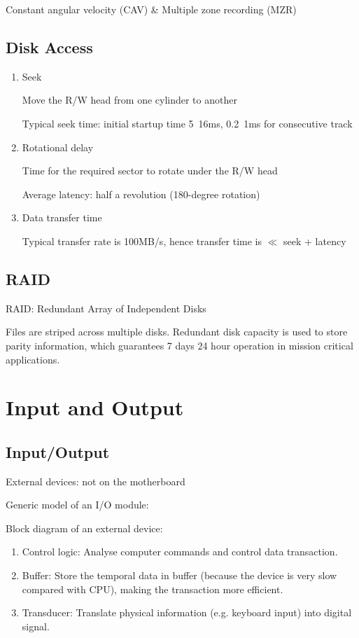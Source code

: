 \documentclass[11pt,a4paper]{article}
\begin{document}
Constant angular velocity (CAV) \& Multiple zone recording (MZR) \par
{}

\subsection{Disk Access}
\begin{enumerate}
    \item [1. ] Seek \par
        Move the R/W head from one cylinder to another \par
        Typical seek time: initial startup time 5~16ms, 0.2~1ms for consecutive track
    
    \item [2. ] Rotational delay \par
        Time for the required sector to rotate under the R/W head \par
        Average latency: half a revolution (180-degree rotation)
    
    \item [3. ] Data transfer time \par
        Typical transfer rate is 100MB/s, hence transfer time is $\ll$ seek + latency

\end{enumerate}

\subsection{RAID}
RAID: Redundant Array of Independent Disks \par
Files are striped across multiple disks. Redundant disk capacity is used to store parity information, which guarantees 7 days 24 hour operation in mission critical applications. 

\section{Input and Output}
\subsection{Input/Output}
External devices: not on the motherboard \par
Generic model of an I/O module:

Block diagram of an external device:
\begin{enumerate}
    \item [] Control logic: Analyse computer commands and control data transaction.
    \item [] Buffer: Store the temporal data in buffer (because the device is very slow compared with CPU), making the transaction more efficient.
    \item [] Transducer: Translate physical information (e.g. keyboard input) into digital signal.
\end{enumerate}
\end{document}
